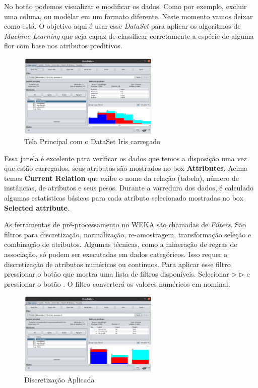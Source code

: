 \documentclass[a4paper,11pt]{article}
\begin{document}
No botão  podemos visualizar e modificar os dados. Como por exemplo, excluir uma coluna, ou modelar em um formato diferente. Neste momento vamos deixar como está. O objetivo aqui é usar esse \textit{DataSet} para aplicar os algoritmos de \textit{Machine Learning} que seja capaz de classificar corretamente a espécie de alguma flor com base nos atributos preditivos. 
\begin{figure}[H]
	\centering
	\includegraphics[width=0.6\textwidth]{imagem/explorer.png}
	\caption{Tela Principal com o DataSet Iris carregado}
\end{figure}

Essa janela é excelente para verificar os dados que temos a disposição uma vez que estão carregados, seus atributos são mostrados no box \textbf{Attributes}. Acima temos \textbf{Current Relation} que exibe o nome da relação (tabela), número de instâncias, de atributos e seus pesos. Durante a varredura dos dados, é calculado algumas estatísticas básicas para cada atributo selecionado mostradas no box \textbf{Selected attribute}. 

As ferramentas de pré-processamento no WEKA são chamadas de \textit{Filters}. São filtros para discretização, normalização, re-amostragem, transformação seleção e combinação de atributos. Algumas técnicas, como a mineração de regras de associação, só podem ser executadas em dados categóricos. Isso requer a discretização de atributos numéricos ou contínuos. Para aplicar esse filtro pressionar o botão  que mostra uma lista de filtros disponíveis. Selecionar  $\triangleright$  $\triangleright$  e pressionar o botão . O filtro converterá os valores numéricos em nominal.
\begin{figure}[H]
	\centering
	\includegraphics[width=0.6\textwidth]{imagem/filtros.png}
	\caption{Discretização Aplicada}
\end{figure}
\end{document}
